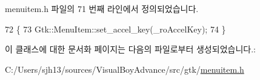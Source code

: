 menuitem.\+h 파일의 71 번째 라인에서 정의되었습니다.


\begin{DoxyCode}
72     \{
73       Gtk::MenuItem::set\_accel\_key(\_roAccelKey);
74     \}
\end{DoxyCode}


이 클래스에 대한 문서화 페이지는 다음의 파일로부터 생성되었습니다.\+:\begin{DoxyCompactItemize}
\item 
C\+:/\+Users/sjh13/sources/\+Visual\+Boy\+Advance/src/gtk/\mbox{\hyperlink{menuitem_8h}{menuitem.\+h}}\end{DoxyCompactItemize}
